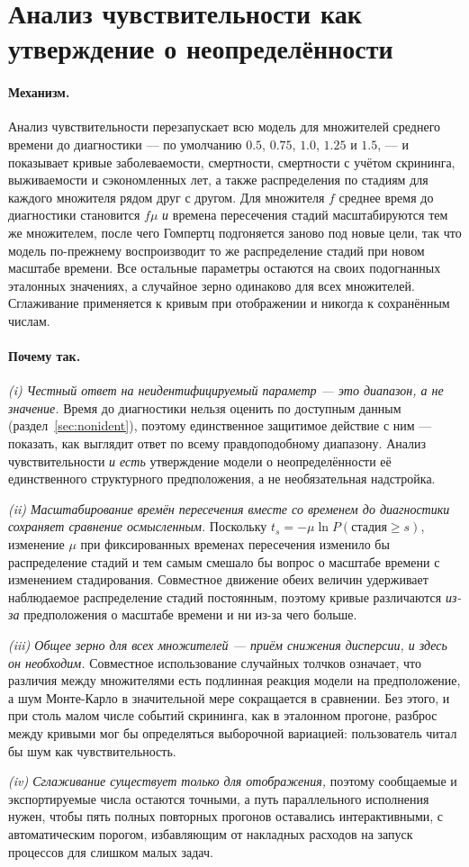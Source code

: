 \documentclass[12pt,a4paper]{article}
\newcommand{\mech}[1]{\paragraph{Механизм.} #1}
\newcommand{\why}[1]{\paragraph{Почему так.} #1}
\begin{document}
\section{Анализ чувствительности как утверждение о неопределённости}
\label{sec:sens}

\mech{Анализ чувствительности перезапускает всю модель для множителей среднего времени до диагностики ---
по умолчанию $0.5$, $0.75$, $1.0$, $1.25$ и $1.5$, --- и показывает кривые заболеваемости, смертности,
смертности с учётом скрининга, выживаемости и сэкономленных лет, а также распределения по стадиям для каждого
множителя рядом друг с другом. Для множителя $f$ среднее время до диагностики становится $f\mu$ \emph{и}
времена пересечения стадий масштабируются тем же множителем, после чего Гомпертц подгоняется заново под
новые цели, так что модель по-прежнему воспроизводит то же распределение стадий при новом масштабе времени.
Все остальные параметры остаются на своих подогнанных эталонных значениях, а случайное зерно одинаково для
всех множителей. Сглаживание применяется к кривым при отображении и никогда к сохранённым числам.}

\why{\emph{(i) Честный ответ на неидентифицируемый параметр --- это диапазон, а не значение.} Время до
диагностики нельзя оценить по доступным данным (раздел~\ref{sec:nonident}), поэтому единственное защитимое
действие с ним --- показать, как выглядит ответ по всему правдоподобному диапазону. Анализ чувствительности
\emph{и есть} утверждение модели о неопределённости её единственного структурного предположения, а не
необязательная надстройка.

\emph{(ii) Масштабирование времён пересечения вместе со временем до диагностики сохраняет сравнение
осмысленным.} Поскольку $t_s=-\mu\ln P(\text{стадия}\ge s)$, изменение $\mu$ при фиксированных временах
пересечения изменило бы распределение стадий и тем самым смешало бы вопрос о масштабе времени с изменением
стадирования. Совместное движение обеих величин удерживает наблюдаемое распределение стадий постоянным,
поэтому кривые различаются \emph{из-за} предположения о масштабе времени и ни из-за чего больше.

\emph{(iii) Общее зерно для всех множителей --- приём снижения дисперсии, и здесь он необходим.} Совместное
использование случайных толчков означает, что различия между множителями есть подлинная реакция модели на
предположение, а шум Монте-Карло в значительной мере сокращается в сравнении. Без этого, и при столь малом
числе событий скрининга, как в эталонном прогоне, разброс между кривыми мог бы определяться выборочной
вариацией: пользователь читал бы шум как чувствительность.

\emph{(iv) Сглаживание существует только для отображения,} поэтому сообщаемые и экспортируемые числа
остаются точными, а путь параллельного исполнения нужен, чтобы пять полных повторных прогонов оставались
интерактивными, с автоматическим порогом, избавляющим от накладных расходов на запуск процессов для слишком
малых задач.}
\end{document}
